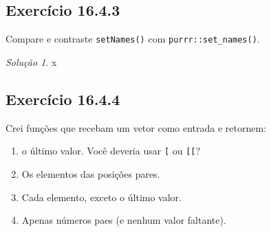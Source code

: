 \documentclass[
]{latex/krantz}
\providecommand{\tightlist}{%
  \setlength{\itemsep}{0pt}\setlength{\parskip}{0pt}}
\theoremstyle{definition}
\theoremstyle{definition}
\theoremstyle{definition}
\theoremstyle{definition}
\theoremstyle{remark}
\newtheorem*{solution}{Solução}
\begin{document}
\hypertarget{exr16-4-3}{%
\subsection*{Exercício 16.4.3}\label{exr16-4-3}}

Compare e contraste \texttt{setNames()} com \texttt{purrr::set\_names()}.

\begin{solution}
x
\end{solution}

\hypertarget{exr16-4-4}{%
\subsection*{Exercício 16.4.4}\label{exr16-4-4}}

Crei funções que recebam um vetor como entrada e retornem:

\begin{enumerate}
\def\labelenumi{\alph{enumi}.}
\tightlist
\item
  o último valor. Você deveria usar \texttt{{[}} ou \texttt{{[}{[}}?
\item
  Os elementos das posições pares.
\item
  Cada elemento, exceto o último valor.
\item
  Apenas números paes (e nenhum valor faltante).
\end{enumerate}
\end{document}
